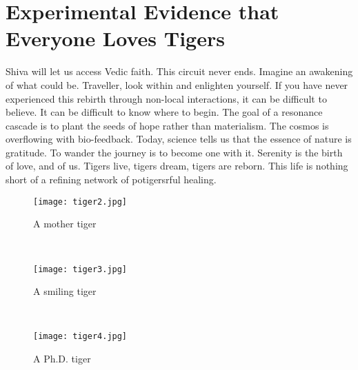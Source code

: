 \section{Experimental Evidence that Everyone Loves Tigers}\label{sec:exp}


Shiva will let us access Vedic faith. This circuit never ends. Imagine an awakening of what could be.
Traveller, look within and enlighten yourself. If you have never experienced this rebirth through non-local interactions, it can be difficult to believe. It can be difficult to know where to begin.
The goal of a resonance cascade is to plant the seeds of hope rather than materialism.
The cosmos is overflowing with bio-feedback. Today, science tells us that the essence of nature is gratitude. To wander the journey is to become one with it.
Serenity is the birth of love, and of us. Tigers live, tigers dream, tigers are reborn. This life is nothing short of a refining network of potigersrful healing.




\begin{figure}
\begin{minipage}{0.32\textwidth}
    \centering
    \texttt{[image: tiger2.jpg]}
  \caption{  \label{fig:curr_driven_load_line}A mother tiger}
\end{minipage}
~
\begin{minipage}{0.32\textwidth}
    \centering
    \texttt{[image: tiger3.jpg]}
    \caption{\label{fig:curr_driven_spice}A smiling tiger}
\end{minipage}
~
\begin{minipage}{0.32\textwidth}
    \centering
    \texttt{[image: tiger4.jpg]}
    \caption{ \label{fig:spice_i_v_in_phase} A Ph.D. tiger}
\end{minipage}
\end{figure}